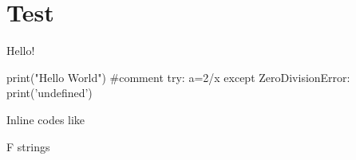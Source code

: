 \chapter{Test}


\begin{code}\caption{Hello!} \begin{python}
    print("Hello World") #comment
    try:
        a=2/x
    except ZeroDivisionError:
        print('undefined')
\end{python}\label{code:hello}\end{code}

Inline codes like 

\begin{code}\caption{F strings}
\label{code:fstrings}\end{code}